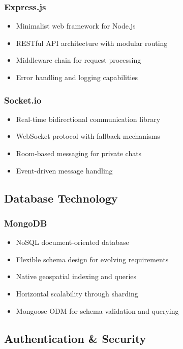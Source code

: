 \documentclass[12pt,a4paper]{article}
\begin{document}
\subsubsection{Express.js}
\begin{itemize}
    \item Minimalist web framework for Node.js
    \item RESTful API architecture with modular routing
    \item Middleware chain for request processing
    \item Error handling and logging capabilities
\end{itemize}

\subsubsection{Socket.io}
\begin{itemize}
    \item Real-time bidirectional communication library
    \item WebSocket protocol with fallback mechanisms
    \item Room-based messaging for private chats
    \item Event-driven message handling
\end{itemize}

\subsection{Database Technology}

\subsubsection{MongoDB}
\begin{itemize}
    \item NoSQL document-oriented database
    \item Flexible schema design for evolving requirements
    \item Native geospatial indexing and queries
    \item Horizontal scalability through sharding
    \item Mongoose ODM for schema validation and querying
\end{itemize}

\subsection{Authentication \& Security}
\end{document}
